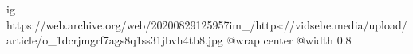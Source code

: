  
 
 
 
 

\ifcmt
  ig https://web.archive.org/web/20200829125957im_/https://vidsebe.media/upload/article/o_1dcrjmgrf7ags8q1ss31jbvh4tb8.jpg
  @wrap center
  @width 0.8
\fi
